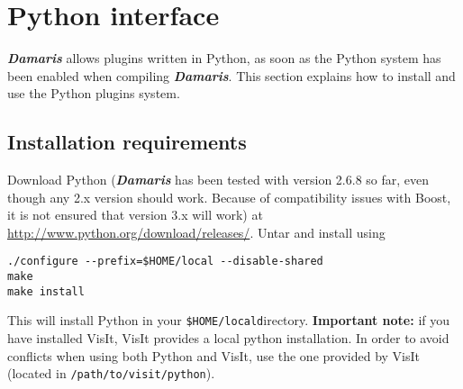 \documentclass[11pt]{report}
\newcommand{\Damaris}{\emph{\textbf{Damaris}}}
\newcommand{\installdir}[1]{\texttt{\$HOME/local#1}}
\begin{document}
\noindent\begin{minipage}{\textwidth}
\vspace{0.5cm}

\end{minipage}

\noindent\begin{minipage}{\textwidth}
\vspace{0.5cm}

\end{minipage}

\chapter{Python interface}\label{Python}

\Damaris{} allows plugins written in Python, as soon as the Python system has been
enabled when compiling \Damaris{}. This section explains how to install and use the Python
plugins system.

\section{Installation requirements}

Download Python (\Damaris{} has been tested with version 2.6.8 so far, even though any 2.x version
should work. Because of compatibility issues with Boost, it is not ensured that version 3.x will work) at 
\url{http://www.python.org/download/releases/}.
Untar and install using
\begin{verbatim}
./configure --prefix=$HOME/local --disable-shared
make
make install
\end{verbatim}

This will install Python in your \installdir directory. \textbf{Important note:} if you have installed VisIt,
VisIt provides a local python installation. In order to avoid conflicts when using both Python and VisIt,
use the one provided by VisIt (located in \texttt{/path/to/visit/python}).
\end{document}
